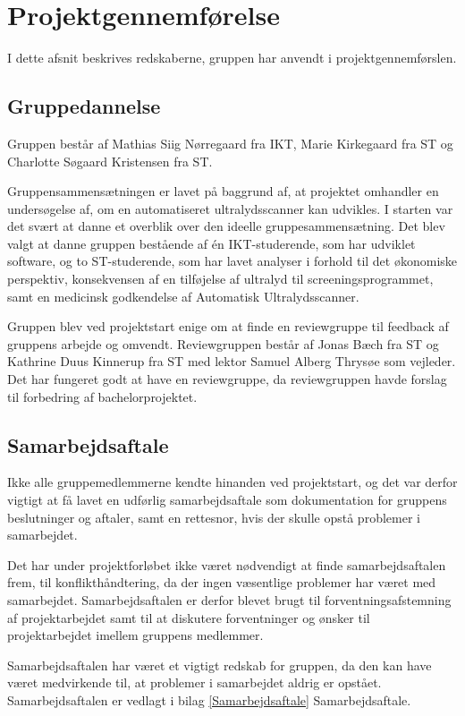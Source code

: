 \chapter{Projektgennemførelse}\label{kapitel_Projektgennemforelse}
I dette afsnit beskrives redskaberne, gruppen har anvendt i projektgennemførslen. 

\section{Gruppedannelse}
Gruppen består af Mathias Siig Nørregaard fra IKT, Marie Kirkegaard fra ST og Charlotte Søgaard Kristensen fra ST. 

Gruppensammensætningen er lavet på baggrund af, at projektet omhandler en undersøgelse af, om en automatiseret ultralydsscanner kan udvikles. I starten var det svært at danne et overblik over den ideelle gruppesammensætning. Det blev valgt at danne gruppen bestående af én IKT-studerende, som har udviklet software, og to ST-studerende, som har lavet analyser i forhold til det økonomiske perspektiv, konsekvensen af en tilføjelse af ultralyd til screeningsprogrammet, samt en medicinsk godkendelse af Automatisk Ultralydsscanner. 

Gruppen blev ved projektstart enige om at finde en reviewgruppe til feedback af gruppens arbejde og omvendt. Reviewgruppen består af Jonas Bæch fra ST og Kathrine Duus Kinnerup fra ST med lektor Samuel Alberg Thrysøe som vejleder. Det har fungeret godt at have en reviewgruppe, da reviewgruppen havde forslag til forbedring af bachelorprojektet.  

\section{Samarbejdsaftale}
Ikke alle gruppemedlemmerne kendte hinanden ved projektstart, og det var derfor vigtigt at få lavet en udførlig samarbejdsaftale som dokumentation for gruppens beslutninger og aftaler, samt en rettesnor, hvis der skulle opstå problemer i samarbejdet. 

Det har under projektforløbet ikke været nødvendigt at finde samarbejdsaftalen frem, til konflikthåndtering, da der ingen væsentlige problemer har været med samarbejdet. Samarbejdsaftalen er derfor blevet brugt til forventningsafstemning af projektarbejdet samt til at diskutere forventninger og ønsker til projektarbejdet imellem gruppens medlemmer. 

Samarbejdsaftalen har været et vigtigt redskab for gruppen, da den kan have været medvirkende til, at problemer i samarbejdet aldrig er opstået. Samarbejdsaftalen er vedlagt i bilag \ref{Samarbejdsaftale} Samarbejdsaftale. 

